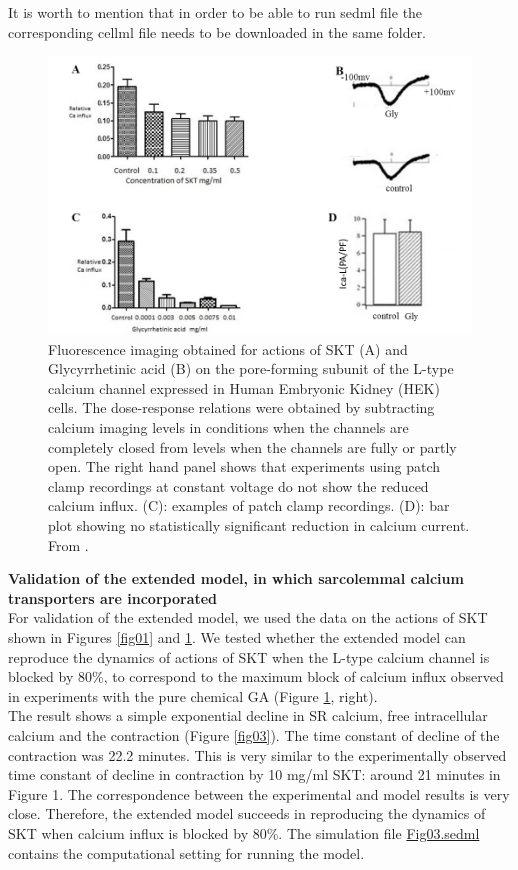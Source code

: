 \documentclass[fleqn,10pt]{physiome}
\begin{document}
It is worth to mention that in order to be able to run sedml file the corresponding cellml file needs to be downloaded in the same folder.

\begin{figure}[h!]
\centering
\includegraphics[width=0.8\linewidth]{figure02}
\caption{Fluorescence imaging obtained for actions of SKT (A) and Glycyrrhetinic acid (B) on the pore-forming subunit of the L-type calcium channel expressed in Human Embryonic Kidney (HEK) cells. The dose-response relations were obtained by subtracting calcium imaging levels in conditions when the channels are completely closed from levels when the channels are fully or partly open. The right hand panel shows that experiments using patch clamp recordings at constant voltage do not show the reduced calcium influx. (C): examples of patch clamp recordings. (D): bar plot showing no statistically significant reduction in calcium current. From \citep{noble2016action}.}
\label{fig02}
\end{figure}

\textbf{Validation of the extended model, in which sarcolemmal calcium transporters are incorporated}\\\newline
For validation of the extended model, we used the data on the actions of SKT shown in Figures \ref{fig01} and \ref{fig02}. We tested whether the extended model can reproduce the dynamics of actions of SKT when the L-type calcium channel is blocked by 80\%, to correspond to the maximum block of calcium influx observed in experiments with the pure chemical GA (Figure \ref{fig02}, right).\\\newpage
The result shows a simple exponential decline in SR calcium, free intracellular calcium and the contraction (Figure \ref{fig03}). The time constant of decline of the contraction was 22.2 minutes. This is very similar to the experimentally observed time constant of decline in contraction by 10 mg/ml SKT: around 21 minutes in Figure 1. The correspondence between the experimental and model results is very close. Therefore, the extended model succeeds in reproducing the dynamics of SKT when calcium influx is blocked by 80\%. 
The simulation file \href{http://models.cellml.org/workspace/5f4/file/2807f4098d7bfb04507e1d2f876e30aa001e8ead/Fig03.sedml}{Fig03.sedml} contains the computational setting for running the model.
\newline
\end{document}
